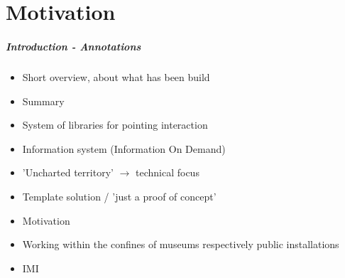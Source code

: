 \chapter{Motivation}
\label{motivation}

%
%

\paragraph{Introduction - Annotations}

\begin{itemize}
	\item Short overview, about what has been build
	\item Summary
	\\
	\item System of libraries for pointing interaction
	\item Information system (Information On Demand)
	\item 'Uncharted territory' $\to$ technical focus
	\item Template solution / 'just a proof of concept'
  \\
	\item Motivation
	\item Working within the confines of museums respectively public installations
	\\
	\item \ac{IMI} %
\end{itemize}

